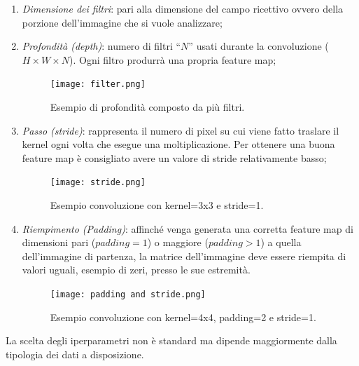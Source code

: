 \begin{enumerate}
    \item \emph{Dimensione dei filtri}: pari alla dimensione del campo ricettivo ovvero 
    della porzione dell'immagine che si vuole analizzare;
    \item \emph{Profondità (depth)}: numero di filtri “$N$” usati durante la convoluzione 
    ($H \times W \times N$). Ogni filtro produrrà una propria feature map;
    \begin{figure}
        \centering
        \texttt{[image: filter.png]}
        \centering
        \caption{Esempio di profondità composto da più filtri.}
        \label{filters depth}
    \end{figure}
    \item \emph{Passo (stride)}: rappresenta il numero di pixel su cui viene fatto traslare 
    il kernel ogni volta che esegue una moltiplicazione. Per ottenere una 
    buona feature map è consigliato avere un valore di stride relativamente basso;
    \begin{figure}
        \centering
        \texttt{[image: stride.png]}
        \centering
        \caption{Esempio convoluzione con kernel=3x3 e stride=1.}
        \label{stride}
    \end{figure}
    \item \emph{Riempimento (Padding)}: affinché venga generata una corretta feature 
    map di dimensioni pari ($padding=1$) o maggiore ($padding>1$) a 
    quella dell'immagine di partenza, la matrice dell'immagine deve essere 
    riempita di valori uguali, esempio di zeri, presso le sue estremità.
    \begin{figure}
        \centering
        \texttt{[image: padding and stride.png]}
        \centering
        \caption{Esempio convoluzione con kernel=4x4, padding=2 e stride=1.}
        \label{padding e stride}
    \end{figure}
\end{enumerate}
La scelta degli iperparametri non è standard ma dipende maggiormente 
dalla tipologia dei dati a disposizione.

